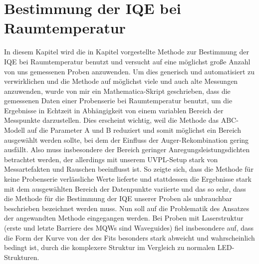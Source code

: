 \chapter{Bestimmung der IQE bei Raumtemperatur}
\thispagestyle{fancy}

In diesem Kapitel wird die in Kapitel vorgestellte Methode zur Bestimmung der IQE bei Raumtemperatur benutzt und versucht auf eine möglichst große Anzahl von uns gemessenen Proben anzuwenden. 
Um dies generisch und automatisiert zu verwirklichen und die Methode auf möglichst viele und auch alte Messungen anzuwenden, wurde von mir ein Mathematica-Skript geschrieben, dass die gemessenen Daten einer Probenserie bei Raumtemperatur benutzt, um die Ergebnisse in Echtzeit in Abhängigkeit von einem variablen Bereich der Messpunkte darzustellen. Dies erscheint wichtig, weil die Methode das ABC-Modell auf die Parameter A und B reduziert und somit möglichst ein Bereich ausgewählt werden sollte, bei dem der Einfluss der Auger-Rekombination gering ausfällt.
Also muss insbesondere der Bereich geringer Anregungsleistungsdichten betrachtet werden, der allerdings mit unserem UVPL-Setup stark von Messartefakten und Rauschen beeinflusst ist. So zeigte sich, dass die Methode für keine Probenserie verlässliche Werte lieferte und stattdessen die Ergebnisse stark mit dem ausgewählten Bereich der Datenpunkte variierte und das so sehr, dass die Methode für die Bestimmung der IQE unserer Proben als unbrauchbar beschrieben bezeichnet werden muss.
Nun soll auf die Problematik des Ansatzes der angewandten Methode eingegangen werden. Bei Proben mit Laserstruktur (erste und letzte Barriere des MQWs sind Waveguides) fiel insbesondere auf, dass die Form der Kurve von der des Fits besonders stark abweicht und wahrscheinlich bedingt ist, durch die komplexere Struktur im Vergleich zu normalen LED-Strukturen. 